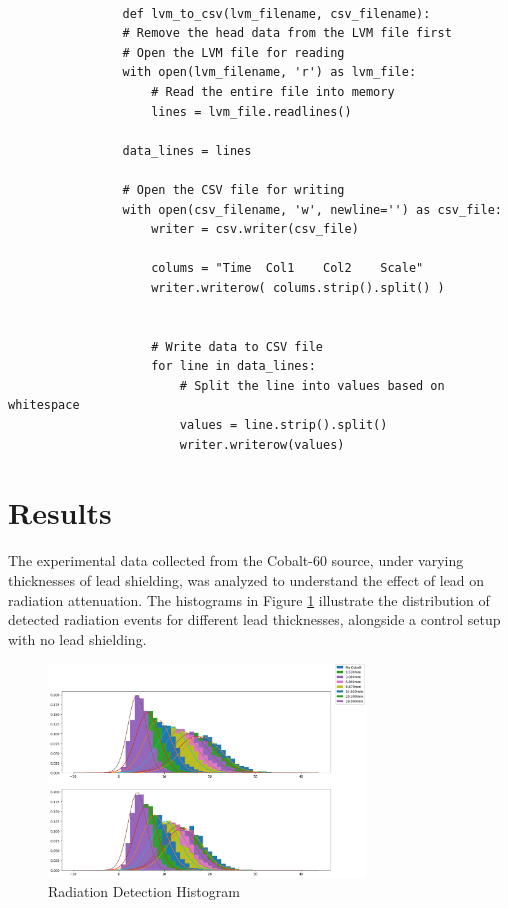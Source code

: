 \documentclass[12pt]{article}
\begin{document}
            \lstset{language=Python}
            \lstset{frame=lines}
            \lstset{basicstyle=\footnotesize}
            \begin{lstlisting}

                def lvm_to_csv(lvm_filename, csv_filename):
                # Remove the head data from the LVM file first
                # Open the LVM file for reading
                with open(lvm_filename, 'r') as lvm_file:
                    # Read the entire file into memory
                    lines = lvm_file.readlines()
            
                data_lines = lines
            
                # Open the CSV file for writing
                with open(csv_filename, 'w', newline='') as csv_file:
                    writer = csv.writer(csv_file)
                    
                    colums = "Time	Col1	Col2	Scale"
                    writer.writerow( colums.strip().split() )
                    
                    
                    # Write data to CSV file
                    for line in data_lines:
                        # Split the line into values based on whitespace
                        values = line.strip().split()
                        writer.writerow(values)
            \end{lstlisting}
                

\section{Results}
    The experimental data collected from the Cobalt-60 source, under varying thicknesses of lead shielding, 
    was analyzed to understand the effect of lead on radiation attenuation. The histograms in 
    Figure \ref{fig:Radiation Detection Histogram} illustrate the distribution of detected radiation events for different lead 
    thicknesses, alongside a control setup with no lead shielding.

    \begin{figure}[!htb]
        \centering
        \includegraphics[width=0.75\textwidth]{./img/plots/thickness.png}
        \caption{Radiation Detection Histogram}
        \label{fig:Radiation Detection Histogram}
    \end{figure}
\end{document}
